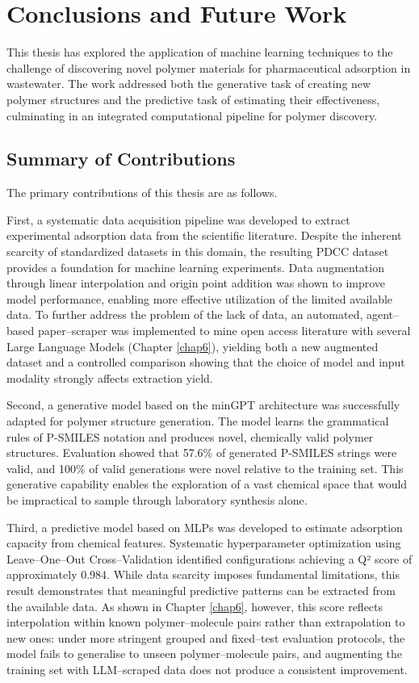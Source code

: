 \chapter{Conclusions and Future Work}
\label{chap7}

This thesis has explored the application of machine learning techniques to the challenge of discovering novel polymer materials for pharmaceutical adsorption in wastewater. The work addressed both the generative task of creating new polymer structures and the predictive task of estimating their effectiveness, culminating in an integrated computational pipeline for polymer discovery.

\section{Summary of Contributions}
\label{sec:summary}

The primary contributions of this thesis are as follows.

First, a systematic data acquisition pipeline was developed to extract experimental adsorption data from the scientific literature. Despite the inherent scarcity of standardized datasets in this domain, the resulting PDCC dataset provides a foundation for machine learning experiments. Data augmentation through linear interpolation and origin point addition was shown to improve model performance, enabling more effective utilization of the limited available data. To further address the problem of the lack of data, an automated, agent--based paper--scraper was implemented to mine open access literature with several Large Language Models (Chapter \ref{chap6}), yielding both a new augmented dataset and a controlled comparison showing that the choice of model and input modality strongly affects extraction yield.

Second, a generative model based on the minGPT architecture was successfully adapted for polymer structure generation. The model learns the grammatical rules of P-SMILES notation and produces novel, chemically valid polymer structures. Evaluation showed that 57.6\% of generated P-SMILES strings were valid, and 100\% of valid generations were novel relative to the training set. This generative capability enables the exploration of a vast chemical space that would be impractical to sample through laboratory synthesis alone.

Third, a predictive model based on MLPs was developed to estimate adsorption capacity from chemical features. Systematic hyperparameter optimization using Leave--One--Out Cross--Validation identified configurations achieving a Q² score of approximately 0.984. While data scarcity imposes fundamental limitations, this result demonstrates that meaningful predictive patterns can be extracted from the available data. As shown in Chapter \ref{chap6}, however, this score reflects interpolation within known polymer--molecule pairs rather than extrapolation to new ones: under more stringent grouped and fixed--test evaluation protocols, the model fails to generalise to unseen polymer--molecule pairs, and augmenting the training set with LLM--scraped data does not produce a consistent improvement.


